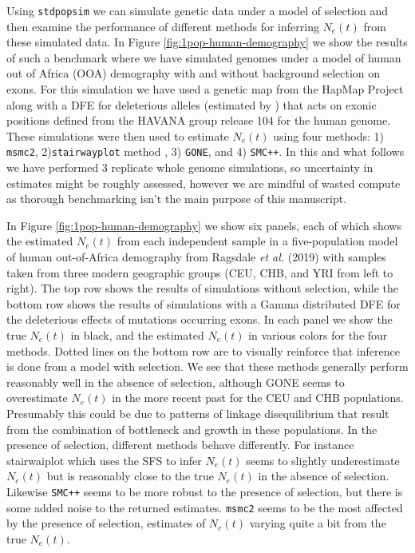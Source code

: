 \documentclass[hidelinks]{article}
\newcommand{\stdpopsim}{\texttt{stdpopsim}\xspace}
\newcommand{\msmc}{\texttt{msmc2}\xspace}
\newcommand{\stairway}{\texttt{stairwayplot}\xspace}
\newcommand{\gone}{\texttt{GONE}\xspace}
\newcommand{\smcpp}{\texttt{SMC++}\xspace}
\begin{document}
    Using \stdpopsim we can simulate genetic data under a model of selection and then 
    examine the performance of different methods for inferring $N_e(t)$ from these simulated 
    data. In Figure \ref{fig:1pop-human-demography} we show the results of such a benchmark
    where we have simulated genomes under a model of human out of Africa (OOA) demography
    with and without background selection on exons. For this simulation we have used
    a genetic map from the HapMap Project \citep{international2007second} along with a
    DFE for deleterious alleles (estimated by \cite{huber2017determining})
    that acts on exonic positions defined from the HAVANA group release 104 for the human genome. 
    These simulations were then used to estimate $N_e(t)$ using four methods: 1) \msmc \citep{Schiffels2020}, 
    2)\stairway method \citep{liu2020stairway}, 3) \gone \citep{santiago2020recent}, and 4) \smcpp \citep{terhorst2017robust}.
    In this and what follows we have performed 3 replicate whole genome simulations, so uncertainty in estimates might
    be roughly assessed, however we are mindful of wasted compute as thorough benchmarking
    isn't the main purpose of this manuscript.
    
    In Figure \ref{fig:1pop-human-demography} we show six panels, each of which shows the estimated $N_e(t)$
    from each independent sample in a five-population model of human out-of-Africa demography
    from Ragsdale \textit{et al.} (2019)
    with samples taken from three modern geographic groups (CEU, CHB, and YRI from left to right).
    The top row shows the results of simulations without selection, while the bottom row shows the results
    of simulations with a Gamma distributed DFE for the deleterious effects of mutations occurring exons. In each panel we show the true $N_e(t)$ in black, and the estimated $N_e(t)$
    in various colors for the four methods. Dotted lines on the bottom row are to visually reinforce that inference is done
    from a model with selection. We see that these methods generally perform reasonably well in the absence of selection, 
    although GONE seems to overestimate $N_e(t)$ in the more recent past for the CEU and CHB populations.
    Presumably this could be due to patterns of linkage disequilibrium that result from the combination
    of bottleneck and growth in these populations.
    In the presence of selection, different methods behave differently. 
    For instance stairwaiplot which uses the SFS to infer $N_e(t)$ seems to slightly underestimate $N_e(t)$
    but is reasonably close to the true $N_e(t)$ in the absence of selection.
    Likewise \smcpp seems to be more robust to the presence of selection,
    but there is some added noise to the returned estimates. 
    \msmc seems to be the most affected by the presence of selection, 
    estimates of $N_e(t)$ varying quite a bit from the true $N_e(t)$.
\end{document}
